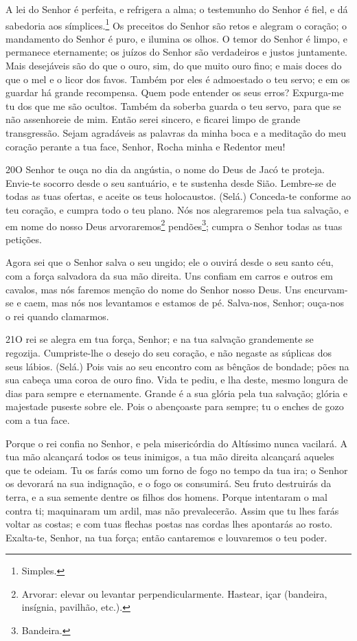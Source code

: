 A lei do Senhor é perfeita, e refrigera a alma; o testemunho do
Senhor é fiel, e dá sabedoria aos símplices.\footnote{Simples.}
Os preceitos do Senhor são retos e alegram o coração; o
mandamento do Senhor é puro, e ilumina os olhos. O temor do
Senhor é limpo, e permanece eternamente; os juízos do Senhor são
verdadeiros e justos juntamente. Mais desejáveis são do que o
ouro, sim, do que muito ouro fino; e mais doces do que o mel e o
licor dos favos. Também por eles é admoestado o teu servo; e
em os guardar há grande recompensa.
 Quem pode entender os seus erros? Expurga-me tu dos que me são
ocultos. Também da soberba guarda o teu servo, para que se
não assenhoreie de mim. Então serei sincero, e ficarei limpo de
grande transgressão. Sejam agradáveis as palavras da minha
boca e a meditação do meu coração perante a tua face, Senhor, Rocha
minha e Redentor meu!

\bigskip

\lettrine{20}{}O Senhor te ouça no dia da angústia, o nome do
Deus de Jacó te proteja. Envie-te socorro desde o seu santuário,
e te sustenha desde Sião. Lembre-se de todas as tuas ofertas, e
aceite os teus holocaustos. (Selá.) Conceda-te conforme ao teu
coração, e cumpra todo o teu plano. Nós nos alegraremos pela tua
salvação, e em nome do nosso Deus arvoraremos\footnote{Arvorar:
elevar ou levantar perpendicularmente. Hastear, içar (bandeira,
insígnia, pavilhão, etc.).} pendões\footnote{Bandeira.}; cumpra o
Senhor todas as tuas petições.

Agora sei que o Senhor salva o seu ungido; ele o ouvirá desde o
seu santo céu, com a força salvadora da sua mão direita. Uns
confiam em carros e outros em cavalos, mas nós faremos menção do
nome do Senhor nosso Deus. Uns encurvam-se e caem, mas nós nos
levantamos e estamos de pé. Salva-nos, Senhor; ouça-nos o rei
quando clamarmos.

\bigskip

\lettrine{21}{}O rei se alegra em tua força, Senhor; e na tua
salvação grandemente se regozija. Cumpriste-lhe o desejo do seu
coração, e não negaste as súplicas dos seus lábios. (Selá.) Pois
vais ao seu encontro com as bênçãos de bondade; pões na sua cabeça
uma coroa de ouro fino. Vida te pediu, e lha deste, mesmo
longura de dias para sempre e eternamente. Grande é a sua glória
pela tua salvação; glória e majestade puseste sobre ele. Pois o
abençoaste para sempre; tu o enches de gozo com a tua face.

Porque o rei confia no Senhor, e pela misericórdia do Altíssimo
nunca vacilará. A tua mão alcançará todos os teus inimigos, a
tua mão direita alcançará aqueles que te odeiam. Tu os farás
como um forno de fogo no tempo da tua ira; o Senhor os devorará na
sua indignação, e o fogo os consumirá. Seu fruto destruirás
da terra, e a sua semente dentre os filhos dos homens. Porque
intentaram o mal contra ti; maquinaram um ardil, mas não
prevalecerão. Assim que tu lhes farás voltar as costas; e com
tuas flechas postas nas cordas lhes apontarás ao rosto.
Exalta-te, Senhor, na tua força; então cantaremos e
louvaremos o teu poder.

